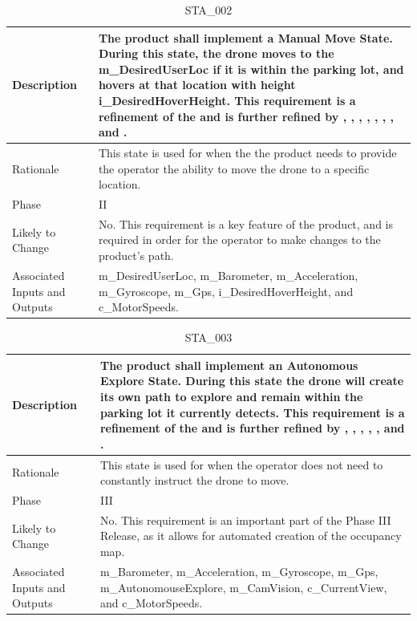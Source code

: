 \documentclass{article}
\begin{document}
\begin{table}[!h]
\begin{center}
\caption {STA\_002} 
\label{STA_002}
\begin{tabular}{ | m{3cm} | m{11cm} | }
\hline
Description & The product shall implement a Manual Move State. During this state, the drone moves to the m\_DesiredUserLoc if it is within the parking lot, and hovers at that location with height i\_DesiredHoverHeight. This requirement is a refinement of the \nameref{Manual Move State} and is further refined by \nameref{PERF_003}, \nameref{PERF_004}, \nameref{PERF_006}, \nameref{PERF_007}, \nameref{SAFE_001}, \nameref{SAFE_003}, \nameref{USE_003}, and \nameref{PERF_008}. \\
\hline
Rationale & This state is used for when the the product needs to provide the operator the ability to move the drone to a specific location. \\
\hline
Phase & II \\
\hline
Likely to Change & No. This requirement is a key feature of the product, and is required in order for the operator to make changes to the product's path. \\
\hline
Associated Inputs and Outputs & m\_DesiredUserLoc, m\_Barometer, m\_Acceleration, m\_Gyroscope, m\_Gps, i\_DesiredHoverHeight, and c\_MotorSpeeds. \\
\hline
\end{tabular}
\end{center}
\end{table}

\begin{table}[!h]
\begin{center}
\caption {STA\_003} 
\label{STA_003}
\begin{tabular}{ | m{3cm} | m{11cm} | }
\hline
Description & The product shall implement an Autonomous Explore State. During this state the drone will create its own path to explore and remain within the parking lot it currently detects. This requirement is a refinement of the \nameref{Autonomous Explore State} and is further refined by \nameref{PERF_001}, \nameref{PERF_004}, \nameref{PERF_007}, \nameref{SAFE_001}, \nameref{SAFE_003}, and \nameref{USE_003}. \\
\hline
Rationale & This state is used for when the operator does not need to constantly instruct the drone to move. \\
\hline
Phase & III \\
\hline
Likely to Change & No. This requirement is an important part of the Phase III Release, as it allows for automated creation of the occupancy map. \\
\hline
Associated Inputs and Outputs & m\_Barometer, m\_Acceleration, m\_Gyroscope, m\_Gps, m\_AutonomouseExplore, m\_CamVision, c\_CurrentView, and c\_MotorSpeeds. \\
\hline
\end{tabular}
\end{center}
\end{table}
\end{document}
